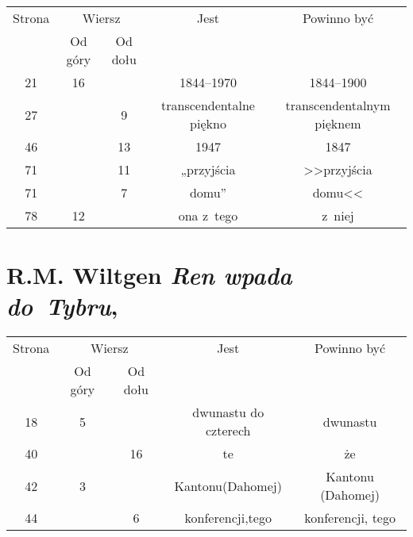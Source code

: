 \documentclass[a4paper,11pt]{article}
\numberwithin{equation}{section}
\begin{document}
\begin{center}

  \begin{tabular}{|c|c|c|c|c|}
    \hline
    Strona & \multicolumn{2}{c|}{Wiersz} & Jest
                              & Powinno być \\ \cline{2-3}
    & Od góry & Od dołu & & \\
    \hline
    21 & 16 & & 1844--1970 & 1844--1900 \\
    27 & & \hphantom{0}9 & transcendentalne piękno
    & transcendentalnym pięknem \\
    46 & & 13 & 1947 & 1847 \\
    71 & & 11 & „przyjścia & >>przyjścia \\
    71 & & \hphantom{0}7 & domu” & domu<< \\
    78 & 12 & & ona z~tego & z~niej \\
    \hline
  \end{tabular}

\end{center}









\section{R.M. Wiltgen \textit{Ren wpada do~Tybru},
  \parencite{WiltgenRenWpadaDoTybru2010}}




\begin{center}

  \begin{tabular}{|c|c|c|c|c|}
    \hline
    Strona & \multicolumn{2}{c|}{Wiersz} & Jest
                              & Powinno być \\ \cline{2-3}
    & Od góry & Od dołu & & \\
    \hline
    18  & \hphantom{0}5 & & dwunastu do czterech & dwunastu \\
    40  & & 16 & te & że \\
    42  & \hphantom{0}3 & & Kantonu(Dahomej) & Kantonu (Dahomej) \\
    44  & & \hphantom{0}6 & konferencji,tego & konferencji, tego \\
    \hline
  \end{tabular}

\end{center}











\printbibliography






\end{document}

